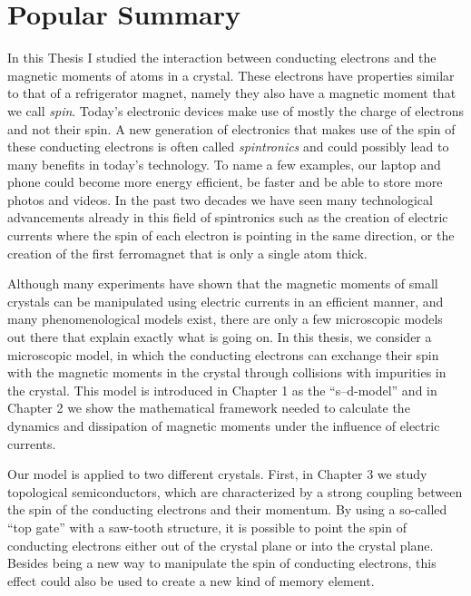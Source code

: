 \manualmark
{}%
%
%
\chapter*{Popular Summary}%
In this Thesis I studied the interaction between conducting electrons and the magnetic moments of atoms in a crystal. These electrons have properties similar to that of a refrigerator magnet, namely they also have a magnetic moment that we call \emph{spin}. Today's electronic devices make use of mostly the charge of electrons and not their spin. A new generation of electronics that makes use of the spin of these conducting electrons is often called \emph{spintronics} and could possibly lead to many benefits in today's technology. To name a few examples, our laptop and phone could become more energy efficient, be faster and be able to store more photos and videos. In the past two decades we have seen many technological advancements already in this field of spintronics such as the creation of electric currents where the spin of each electron is pointing in the same direction, or the creation of the first ferromagnet that is only a single atom thick. 

Although many experiments have shown that the magnetic moments of small crystals can be manipulated using electric currents in an efficient manner, and many phenomenological models exist, there are only a few microscopic models out there that explain exactly what is going on. In this thesis, we consider a microscopic model, in which the conducting electrons can exchange their spin with the magnetic moments in the crystal through collisions with impurities in the crystal. This model is introduced in Chapter 1 as the “s--d-model” and in Chapter 2 we show the mathematical framework needed to calculate the dynamics and dissipation of magnetic moments under the influence of electric currents.

Our model is applied to two different crystals. First, in Chapter 3 we study topological semiconductors, which are characterized by a strong coupling between the spin of the conducting electrons and their momentum. By using a so-called “top gate” with a saw-tooth structure, it is possible to point the spin of conducting electrons either out of the crystal plane or into the crystal plane. Besides being a new way to manipulate the spin of conducting electrons, this effect could also be used to create a new kind of memory element.

